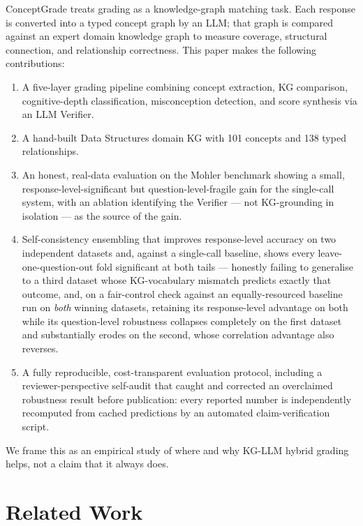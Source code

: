 \documentclass[conference]{IEEEtran}
\begin{document}
ConceptGrade treats grading as a knowledge-graph matching task. Each
response is converted into a typed concept graph by an LLM; that graph is
compared against an expert domain knowledge graph to measure coverage,
structural connection, and relationship correctness. This paper makes the
following contributions:
\begin{enumerate}
  \item A five-layer grading pipeline combining concept extraction, KG
        comparison, cognitive-depth classification, misconception detection,
        and score synthesis via an LLM Verifier.
  \item A hand-built Data Structures domain KG with 101 concepts and 138
        typed relationships.
  \item An honest, real-data evaluation on the Mohler benchmark showing a
        small, response-level-significant but question-level-fragile gain
        for the single-call system, with an ablation identifying the
        Verifier --- not KG-grounding in isolation --- as the source of the
        gain.
  \item Self-consistency ensembling that improves response-level accuracy
        on two independent datasets and, against a single-call baseline,
        shows every leave-one-question-out fold significant at both tails
        --- honestly failing to generalise to a third dataset whose
        KG-vocabulary mismatch predicts exactly that outcome, and, on a
        fair-control check against an equally-resourced baseline run on
        \emph{both} winning datasets, retaining its response-level
        advantage on both while its question-level robustness collapses
        completely on the first dataset and substantially erodes on the
        second, whose correlation advantage also reverses.
  \item A fully reproducible, cost-transparent evaluation protocol,
        including a reviewer-perspective self-audit that caught and
        corrected an overclaimed robustness result before publication:
        every reported number is independently recomputed from cached
        predictions by an automated claim-verification script.
\end{enumerate}
We frame this as an empirical study of where and why KG-LLM hybrid grading
helps, not a claim that it always does.

\section{Related Work}
\end{document}
